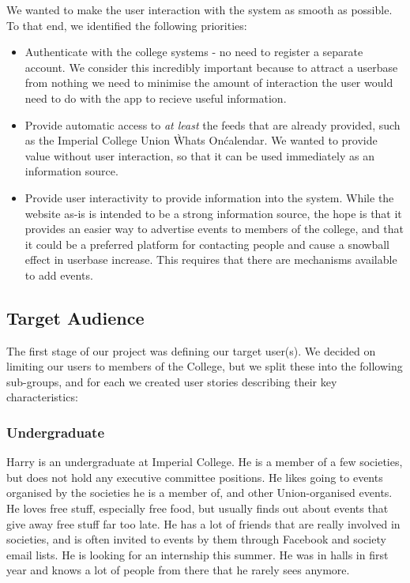 \documentclass[11pt]{article}
\begin{document}
We wanted to make the user interaction with the system as smooth as possible. To that end, we identified the following priorities:

\begin{itemize}
\item Authenticate with the college systems - no need to register a separate account. We consider this incredibly important because to attract a userbase from nothing we need to minimise the amount of interaction the user would need to do with the app to recieve useful information.

\item Provide automatic access to \textit{at least} the feeds that are already provided, such as the Imperial College Union \`Whats On\' calendar. We wanted to provide value without user interaction, so that it can be used immediately as an information source.

\item Provide user interactivity to provide information into the system. While the website as-is is intended to be a strong information source, the hope is that it provides an easier way to advertise events to members of the college, and that it could be a preferred platform for contacting people and cause a snowball effect in userbase increase. This requires that there are mechanisms available to add events.
\end{itemize}

\subsection {Target Audience}

The first stage of our project was defining our target user(s). We decided on limiting our users to members of the College, but we split these into the following sub-groups, and for each we created user stories describing their key characteristics:

\subsubsection{Undergraduate}
Harry is an undergraduate at Imperial College. He is a member of a few societies, but does not hold any executive committee positions. He likes going to events organised by the societies he is a member of, and other Union-organised events. He loves free stuff, especially free food, but usually finds out about events that give away free stuff far too late. He has a lot of friends that are really involved in societies, and is often invited to events by them through Facebook and society email lists. He is looking for an internship this summer. He was in halls in first year and knows a lot of people from there that he rarely sees anymore.
\end{document}
